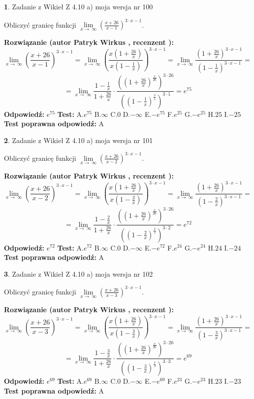\documentclass[12pt, a4paper]{article}
\theoremstyle{definition} %
\newtheorem{zad}{}
\newcommand{\zadStart}[1]{\begin{zad}#1\newline}
\newcommand{\zadStop}{\end{zad}}
\newcommand{\rozwStart}[2]{\noindent \textbf{Rozwiązanie (autor #1 , recenzent #2): }\newline}
\newcommand{\rozwStop}{\newline}
\newcommand{\odpStart}{\noindent \textbf{Odpowiedź:}\newline}
\newcommand{\odpStop}{\newline}
\newcommand{\testStart}{\noindent \textbf{Test:}\newline}
\newcommand{\testStop}{\newline}
\newcommand{\kluczStart}{\noindent \textbf{Test poprawna odpowiedź:}\newline}
\newcommand{\kluczStop}{\newline}
\begin{document}
\zadStart{Zadanie z Wikieł Z 4.10 a) moja wersja nr 100}

Obliczyć granicę funkcji  $\lim\limits_{x\to\ \infty}(\frac{x+26}{x-1})^{3\cdot x-1}$.
\zadStop
\rozwStart{Patryk Wirkus}{}
$$\lim\limits_{x\to\ \infty}(\frac{x+26}{x-1})^{3\cdot x-1} = \lim\limits_{x\to\ \infty}(\frac{x(1+\frac{26}{x})}{x(1-\frac{1}{x})})^{3\cdot x-1}=\lim\limits_{x\to\ \infty}\frac{(1+\frac{26}{x})^{3\cdot x-1}}{(1-\frac{1}{x})^{3\cdot x-1}}=$$
$$=\lim\limits_{x\to\ \infty}\frac{1-\frac{1}{x}}{1+\frac{26}{x}}\cdot\frac{((1+\frac{26}{x})^{\frac{x}{26}})^{3\cdot26}}{((1-\frac{1}{x})^{\frac{x}{1}})^{3\cdot1}}=e^{75}$$
\rozwStop
\odpStart
$e^{75}$
\odpStop
\testStart
A.$e^{75}$ B.$\infty$ C.$0$ D.$-\infty$ E.$-e^{75}$
F.$e^{25}$ G.$-e^{25}$
H.$25$
I.$-25$
\testStop
\kluczStart
A
\kluczStop



\zadStart{Zadanie z Wikieł Z 4.10 a) moja wersja nr 101}

Obliczyć granicę funkcji  $\lim\limits_{x\to\ \infty}(\frac{x+26}{x-2})^{3\cdot x-1}$.
\zadStop
\rozwStart{Patryk Wirkus}{}
$$\lim\limits_{x\to\ \infty}(\frac{x+26}{x-2})^{3\cdot x-1} = \lim\limits_{x\to\ \infty}(\frac{x(1+\frac{26}{x})}{x(1-\frac{2}{x})})^{3\cdot x-1}=\lim\limits_{x\to\ \infty}\frac{(1+\frac{26}{x})^{3\cdot x-1}}{(1-\frac{2}{x})^{3\cdot x-1}}=$$
$$=\lim\limits_{x\to\ \infty}\frac{1-\frac{2}{x}}{1+\frac{26}{x}}\cdot\frac{((1+\frac{26}{x})^{\frac{x}{26}})^{3\cdot26}}{((1-\frac{2}{x})^{\frac{x}{2}})^{3\cdot2}}=e^{72}$$
\rozwStop
\odpStart
$e^{72}$
\odpStop
\testStart
A.$e^{72}$ B.$\infty$ C.$0$ D.$-\infty$ E.$-e^{72}$
F.$e^{24}$ G.$-e^{24}$
H.$24$
I.$-24$
\testStop
\kluczStart
A
\kluczStop



\zadStart{Zadanie z Wikieł Z 4.10 a) moja wersja nr 102}

Obliczyć granicę funkcji  $\lim\limits_{x\to\ \infty}(\frac{x+26}{x-3})^{3\cdot x-1}$.
\zadStop
\rozwStart{Patryk Wirkus}{}
$$\lim\limits_{x\to\ \infty}(\frac{x+26}{x-3})^{3\cdot x-1} = \lim\limits_{x\to\ \infty}(\frac{x(1+\frac{26}{x})}{x(1-\frac{3}{x})})^{3\cdot x-1}=\lim\limits_{x\to\ \infty}\frac{(1+\frac{26}{x})^{3\cdot x-1}}{(1-\frac{3}{x})^{3\cdot x-1}}=$$
$$=\lim\limits_{x\to\ \infty}\frac{1-\frac{3}{x}}{1+\frac{26}{x}}\cdot\frac{((1+\frac{26}{x})^{\frac{x}{26}})^{3\cdot26}}{((1-\frac{3}{x})^{\frac{x}{3}})^{3\cdot3}}=e^{69}$$
\rozwStop
\odpStart
$e^{69}$
\odpStop
\testStart
A.$e^{69}$ B.$\infty$ C.$0$ D.$-\infty$ E.$-e^{69}$
F.$e^{23}$ G.$-e^{23}$
H.$23$
I.$-23$
\testStop
\kluczStart
A
\kluczStop
\end{document}

